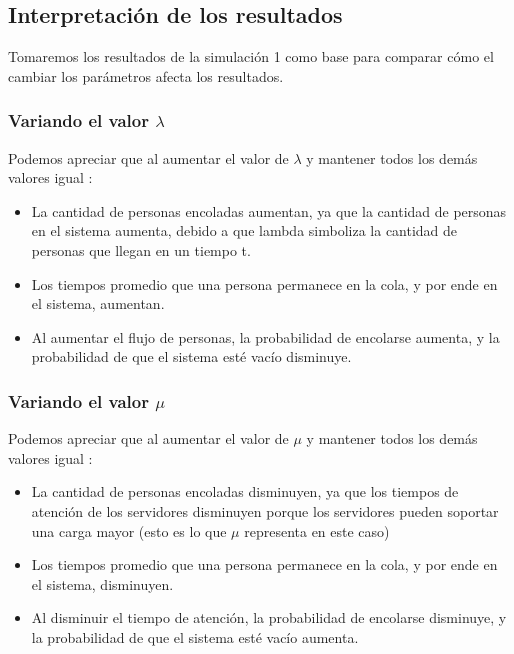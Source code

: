 \documentclass[11pt]{article}
\begin{document}
    \subsection{Interpretación de los resultados}

    Tomaremos los resultados de la simulación 1 como base para comparar cómo el cambiar los parámetros afecta los resultados.

    \subsubsection{Variando el valor $\lambda$}
    Podemos apreciar que al aumentar el valor de $\lambda$ y mantener todos los demás valores igual :
    \begin{itemize}
        \item La cantidad de personas encoladas aumentan, ya que la cantidad de personas en el sistema aumenta, debido a que lambda simboliza la cantidad de personas que llegan en un tiempo t.
        \item Los tiempos promedio que una persona permanece en la cola, y por ende en el sistema, aumentan.
        \item Al aumentar el flujo de personas, la probabilidad de encolarse aumenta, y la probabilidad de que el sistema esté vacío disminuye.
    \end{itemize}

    \subsubsection{Variando el valor $\mu$}
    Podemos apreciar que al aumentar el valor de $\mu$ y mantener todos los demás valores igual :
    \begin{itemize}
        \item La cantidad de personas encoladas disminuyen, ya que los tiempos de atención de los servidores disminuyen porque los servidores pueden soportar una carga mayor (esto es lo que $\mu$ representa en este caso)
        \item Los tiempos promedio que una persona permanece en la cola, y por ende en el sistema, disminuyen.
        \item Al disminuir el tiempo de atención, la probabilidad de encolarse disminuye, y la probabilidad de que el sistema esté vacío aumenta.
    \end{itemize}
\end{document}
